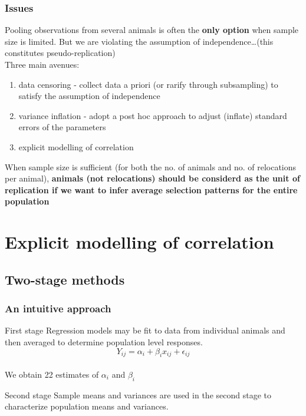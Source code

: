\documentclass[10pt]{beamer}
\begin{document}
\begin{frame}[fragile]
\frametitle{Issues}

Pooling observations from several animals is often the {\bf only option} when sample size is limited. But we are violating the assumption of independence\ldots (this constitutes pseudo-replication)\\
\vspace{0.5cm}
Three main avenues:\begin{enumerate}
\item data censoring - collect data a priori (or rarify through subsampling) to satisfy the assumption of independence
\item variance inflation - adopt a post hoc approach to adjust (inflate) standard errors of the parameters
\item explicit modelling of correlation
\end{enumerate}
\vspace{0.5cm}
When sample size is sufficient (for both the no. of animals and no. of relocations per animal), {\bf animals (not relocations) should be considerd as the unit of replication if we want to infer average selection patterns for the entire population}

\end{frame}



\section{Explicit modelling of correlation}
\subsection{Two-stage methods}

\begin{frame}[fragile]
\frametitle{An intuitive approach}

\begin{block}{First stage}
Regression models may be fit to data from individual animals and then averaged to determine population level responses.\\
$$ Y_{ij} = \alpha_i + \beta_i x_{ij} + \epsilon_{ij} $$\\
We obtain 22 estimates of $\alpha_i$ and $\beta_i$
\end{block}

\begin{block}{Second stage}
Sample means and variances are used in the second stage to characterize population means and variances.\\
\end{block}

\end{frame}
\end{document}
